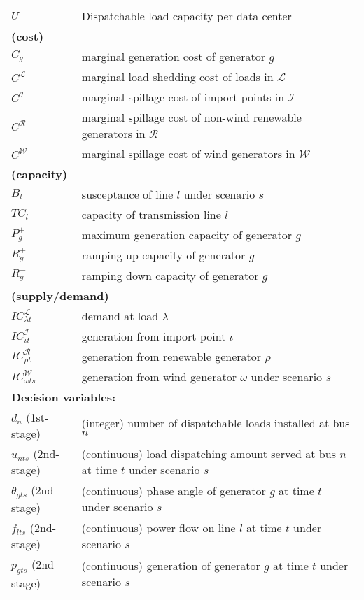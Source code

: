 \begin{table}[H]
{\begin{tabular}{ll}
			$U$ & Dispatchable load capacity per data center \\
			\multicolumn{2}{l}{\textbf{(cost)}} \\
			$C_g$ & marginal generation cost of generator $g$	\\
			$C^\mathcal{L}$ & marginal load shedding cost of loads in $\mathcal{L}$	\\
			$C^\mathcal{I}$ & marginal spillage cost of import points in $\mathcal{I}$ \\
			$C^\mathcal{R}$ & marginal spillage cost of non-wind  renewable generators in $\mathcal{R}$ \\ 
			$C^\mathcal{W}$ & marginal spillage cost of wind generators in $\mathcal{W}$ \\
			\multicolumn{2}{l}{\textbf{(capacity)}} \\
			$B_{l}$ & susceptance of line $l$ under scenario $s$\\
			$TC_l$ & capacity of transmission line $l$\\
			$P_{g}^+$ & maximum generation capacity of generator $g$\\
			$R_{g}^+$ & ramping up capacity of generator $g$\\
			$R_{g}^-$ & ramping down capacity of generator $g$\\
			\multicolumn{2}{l}{\textbf{(supply/demand)}} \\
			$IC_{\lambda t}^\mathcal{L}$ & demand at load $\lambda$\\
			$IC_{\iota t}^\mathcal{I}$ & generation from import point $\iota$\\
			$IC_{\rho t}^\mathcal{R}$ & generation from renewable generator $\rho$\\
			$IC_{\omega ts}^\mathcal{W}$ & generation from wind generator $\omega$ under scenario $s$\\ \midrule
			\multicolumn{2}{l}{\textbf{Decision variables:}} \\
			$d_n$ (1st-stage) 	& (integer) number of dispatchable loads installed at bus $n$\\
			$u_{nts}$ (2nd-stage)	&	(continuous) load dispatching amount served at bus $n$ at time $t$ under scenario $s$\\
			$\theta_{gts}$ (2nd-stage)	&	(continuous) phase angle of generator $g$ at time $t$ under scenario $s$\\
			$f_{lts}$ (2nd-stage)	&	(continuous) power flow on line $l$ at time $t$ under scenario $s$\\
			$p_{gts}$ (2nd-stage)	&	(continuous) generation of generator $g$ at time $t$ under scenario $s$\\

\end{tabular}}
\end{table}

